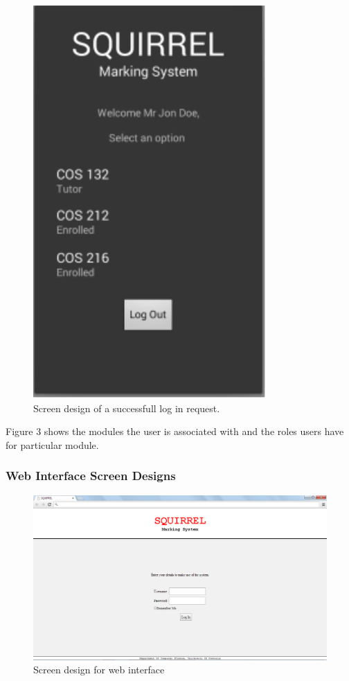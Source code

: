 \documentclass[11pt,a4paper]{article}
\begin{document}
		\begin{figure}[h]
		\centering
		\includegraphics[width=0.7\linewidth, height=15cm]{./mobile_welcomeScreen}
		\caption{Screen design of a successfull log in request.}
		\label{fig:mobile_welcomeScreen}
		\end{figure}
		Figure 3 shows the modules the user is associated with and the roles users have for particular module. 

\pagebreak

\subsubsection{Web Interface Screen Designs}
		\begin{figure}[h]
		\centering
		\includegraphics[width=1.0\linewidth]{./web_login}
		\caption{Screen design for web interface}
		\label{fig:web_login}
		\end{figure}
		
\end{document}

